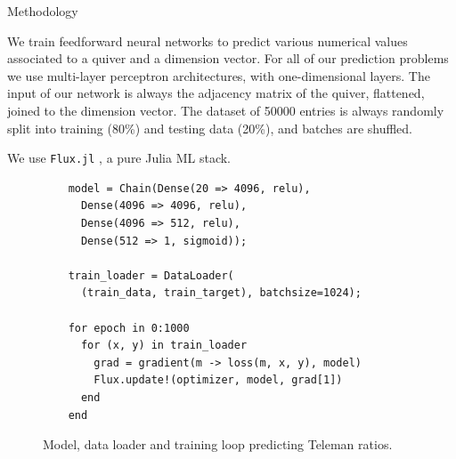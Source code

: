 \documentclass[final,20pt]{beamer}
\newlength{\colwidth}
\begin{document}
\begin{frame}[t, fragile]
\begin{columns}[t]
\begin{column}{\colwidth}
  \begin{block}{Methodology}

    We train feedforward neural networks to predict various numerical values
    associated to a quiver and a dimension vector.
    For all of our prediction problems we use multi-layer perceptron architectures,
    with one-dimensional layers.
    The input of our network is always the adjacency matrix of the quiver, flattened,
    joined to the dimension vector.
    The dataset of 50000 entries is always randomly split
    into training (80\%) and testing data (20\%),
    and batches are shuffled.

    We use {\tt{Flux.jl}} \cite{flux.jl,innes:2018}, a pure Julia ML stack.

    \begin{figure}
    \begin{verbatim}
    model = Chain(Dense(20 => 4096, relu),
      Dense(4096 => 4096, relu),
      Dense(4096 => 512, relu),
      Dense(512 => 1, sigmoid));

    train_loader = DataLoader(
      (train_data, train_target), batchsize=1024);

    for epoch in 0:1000
      for (x, y) in train_loader
        grad = gradient(m -> loss(m, x, y), model)
        Flux.update!(optimizer, model, grad[1])
      end
    end
    \end{verbatim}
    \caption{Model, data loader and training loop predicting Teleman ratios.}
    \end{figure}





\end{block}
\end{column}
\end{columns}
\end{frame}
\end{document}
